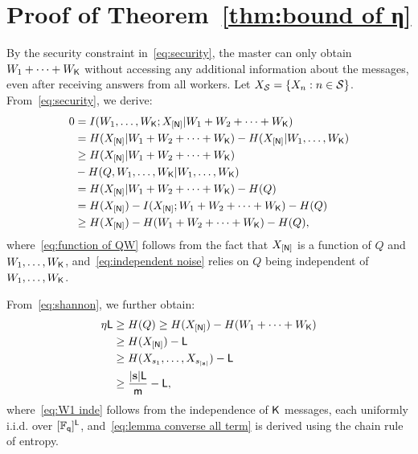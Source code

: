 \documentclass[conference,letterpaper]{IEEEtran}
\begin{document}
\section{Proof of Theorem~\ref{thm:bound of η}}
\label{sec:bound proof}
By the security constraint in~\eqref{eq:security}, the master can only obtain $W_1+\cdots+W_{{\sf K}}$ without accessing any additional information about the messages, even after receiving answers from all workers. Let $X_{{\cal S}}=\{X_n: n \in {\cal S}\}$. From~\eqref{eq:security}, we derive:
\begin{subequations}
\begin{align}
0 &= I(W_1, \ldots, W_{{\sf K}}; X_{[{\sf N}]} | W_1+W_2+\cdots+W_{{\sf K}}) \\
  &= H(X_{[{\sf N}]} | W_1+W_2+\cdots+W_{{\sf K}}) - H(X_{[{\sf N}]} | W_1, \ldots, W_{{\sf K}}) \\
  &\geq H(X_{[{\sf N}]} | W_1+W_2+\cdots+W_{{\sf K}}) \nonumber\\
  &- H(Q, W_1, \ldots, W_{{\sf K}} | W_1, \ldots, W_{{\sf K}}) \label{eq:function of QW} \\
  &= H(X_{[{\sf N}]} | W_1+W_2+\cdots+W_{{\sf K}}) - H(Q) \label{eq:independent noise} \\
  &= H(X_{[{\sf N}]}) - I(X_{[{\sf N}]}; W_1+W_2+\cdots+W_{{\sf K}}) - H(Q) \\
  &\geq H(X_{[{\sf N}]}) - H(W_1+W_2+\cdots+W_{{\sf K}}) - H(Q), \label{eq:shannon}
\end{align}
\end{subequations}
where~\eqref{eq:function of QW} follows from the fact that $X_{[{\sf N}]}$ is a function of $Q$ and $W_1, \ldots, W_{{\sf K}}$, and~\eqref{eq:independent noise} relies on $Q$ being independent of $W_1, \ldots, W_{{\sf K}}$.

From~\eqref{eq:shannon}, we further obtain:
\begin{subequations}
\begin{align}
\eta {\sf L} &\geq H(Q) \geq H(X_{[{\sf N}]}) - H(W_1+\cdots+W_{{\sf K}}) \\
          &\geq H(X_{[{\sf N}]}) - {\sf L} \label{eq:W1 inde} \\
          &\geq H(X_{s_1}, \ldots, X_{s_{|{\bf s}|}}) - {\sf L} \\
          &\geq  \frac{|{\bf s}|{\sf L}}{{\sf m}} - {\sf L}, \label{eq:lemma converse all term}
\end{align}
\end{subequations}
where~\eqref{eq:W1 inde} follows from the independence of ${\sf K}$ messages, each uniformly i.i.d. over $[\mathbb{F}_{{\sf q}}]^{{\sf L}}$, and~\eqref{eq:lemma converse all term} is derived using the chain rule of entropy.
\end{document}
